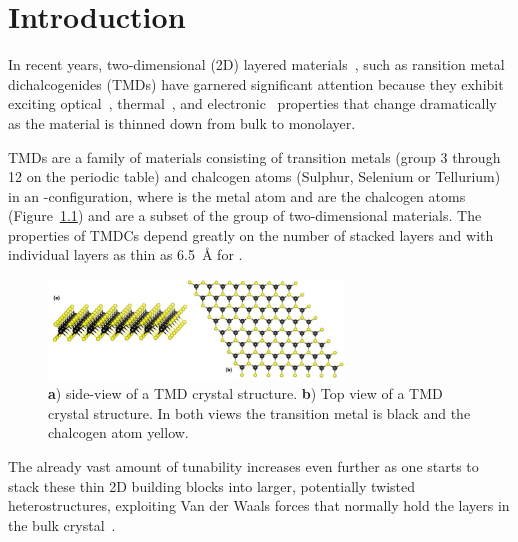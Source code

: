 \chapter{Introduction}
%
In recent years, two-dimensional (2D) layered materials~\cite{2dmat, LI2016322, https://doi.org/10.1002/smll.202107059}, such as ransition metal dichalcogenides (TMDs) have garnered significant attention because they exhibit exciting optical~\cite{optic1, yuHighlyEfficientGatetunable2013, dengBlackPhosphorusMonolayer2014, chengElectroluminescencePhotocurrentGeneration2014}, thermal~\cite{popThermalPropertiesGraphene2012, chenThermoelectricTransportGraphene2015}, and electronic~\cite{britnellFieldEffectTunnelingTransistor2012, georgiouVerticalFieldeffectTransistor2013, yuVerticallyStackedMultiheterostructures2013,moriyaLargeCurrentModulation2014, sarkarSubthermionicTunnelFieldeffect2015} properties that change dramatically as the material is thinned down from bulk to monolayer.

TMDs are a family of materials consisting of transition metals (group 3 through 12 on the periodic table) and chalcogen atoms (Sulphur, Selenium or Tellurium) in an -configuration, where  is the metal atom and  are the chalcogen atoms (Figure~\ref{fig:tmdc_struc}) and are a subset of the group of two-dimensional materials\cite{C7TA04268J}. The properties of TMDCs depend greatly on the number of stacked layers and with individual layers as thin as \SI{6.5}{\angstrom} for .
%
\begin{figure}
    \centering
    \includegraphics[width=0.7\textwidth, keepaspectratio]{resources/Figures/Monolayer_TMDC_structure.jpg}
        \caption{\textbf{a}) side-view of a TMD crystal structure. \textbf{b}) Top view of a TMD crystal structure. In both views the transition metal is black and the chalcogen atom yellow.}
    \label{fig:tmdc_struc}
\end{figure}
%
The already vast amount of tunability increases even further as one starts to stack these thin 2D building blocks into larger, potentially twisted heterostructures, exploiting Van der Waals forces that normally hold the layers in the bulk crystal~\cite{ScopusDocumentDetails, buscemaPhotocurrentGenerationTwodimensional2015, geimVanWaalsHeterostructures2013}.

